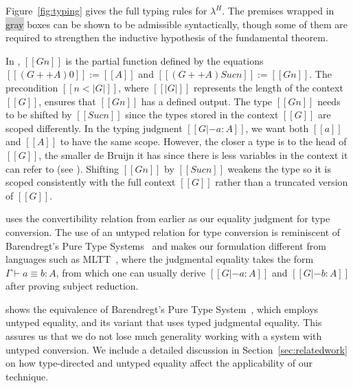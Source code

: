 \documentclass[acmsmall,screen=true,
\ifpublic review=false\else,review=true\fi
  ,anonymous=\ifanonymous true\else false\fi]{acmart}
\newcommand{\lang}{$\lambda^H$\xspace}
\newcommand{\scw}[1]{}
\newcommand{\yl}[1]{}
\begin{document}
Figure~\ref{fig:typing} gives the full typing rules for
\lang{}. The premises wrapped in \colorbox{lightgray}{gray} boxes can be shown to be
admissible syntactically, though some of them are required to
strengthen the inductive hypothesis of the fundamental theorem.

In , $[[G n]]$ is the partial function defined
by the equations $[[ (G ++ A)  0 ]] := [[A]]$ and $[[ (G ++ A) Suc
n ]] := [[G n]]$.
The precondition $[[n < | G | ]]$, where $[[ | G |
]]$ represents the length of the context $[[G]]$, ensures that $[[G
n]]$ has a defined output. The type $[[G n]]$ needs to be shifted
by $[[Suc n]]$ since the types stored in the context $[[G]]$ are
scoped differently. In the typing judgment $[[G |- a : A]]$, we want
both $[[a]]$ and $[[A]]$ to have the same scope. However, the closer a
type is to the head of $[[G]]$, the smaller de Bruijn it has since
there is less variables in the context it can refer to (see ). Shifting $[[G
n]]$ by $[[Suc n]]$ weakens the type so it is scoped consistently with
the full context $[[G]]$ rather than a truncated version of $[[G]]$.

 uses the convertibility relation from earlier
as our equality judgment for type conversion. The use of an untyped
relation for type conversion is reminiscent of Barendregt's Pure Type
Systems~\citet{barendregt1991introduction} and makes our formulation different
from languages such as MLTT~\citep{Martin-Lof-1973}, where the judgmental equality
takes the form $\Gamma \vdash a \equiv b : A$, from which one can
usually derive  $[[G |- a : A]]$ and $[[G |- b : A]]$ after proving
subject reduction.

\citet{siles2012pure} shows the equivalence of Barendregt's
Pure Type System~\citep{barendregt1991introduction}, which employs
untyped equality, and its variant that uses typed judgmental
equality. This assures us that we do not lose much generality working
with a system with untyped conversion. We include a detailed
discussion in Section~\ref{sec:relatedwork} on how type-directed and
untyped equality affect the applicability of our technique.
\end{document}
